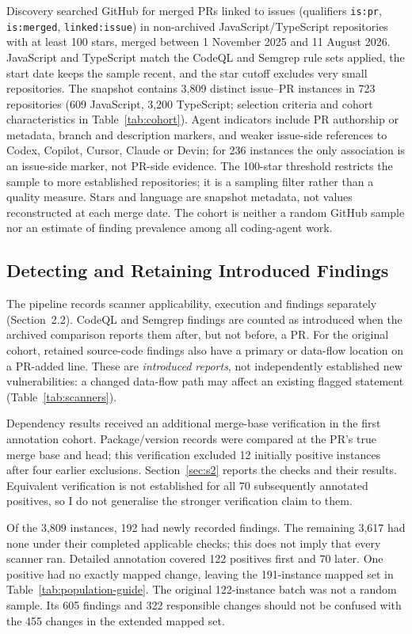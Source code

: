 \documentclass[acmsmall,screen,nonacm]{acmart}
\begin{document}
Discovery searched GitHub for merged PRs linked to issues (qualifiers \texttt{is:pr}, \texttt{is:merged}, \texttt{linked:issue}) in non-archived JavaScript/\allowbreak TypeScript repositories with at least 100 stars, merged between 1 November 2025 and 11 August 2026. JavaScript and TypeScript match the CodeQL and Semgrep rule sets applied, the start date keeps the sample recent, and the star cutoff excludes very small repositories. The snapshot contains 3,809 distinct issue--PR instances in 723 repositories (609 JavaScript, 3,200 TypeScript; selection criteria and cohort characteristics in Table~\ref{tab:cohort}). Agent indicators include PR authorship or metadata, branch and description markers, and weaker issue-side references to Codex, Copilot, Cursor, Claude or Devin; for 236 instances the only association is an issue-side marker, not PR-side evidence. The 100-star threshold restricts the sample to more established repositories; it is a sampling filter rather than a quality measure. Stars and language are snapshot metadata, not values reconstructed at each merge date. The cohort is neither a random GitHub sample nor an estimate of finding prevalence among all coding-agent work.

\subsection{Detecting and Retaining Introduced Findings}

The pipeline records scanner applicability, execution and findings separately (Section~2.2). CodeQL and Semgrep findings are counted as introduced when the archived comparison reports them after, but not before, a PR. For the original cohort, retained source-code findings also have a primary or data-flow location on a PR-added line. These are \emph{introduced reports}, not independently established new vulnerabilities: a changed data-flow path may affect an existing flagged statement (Table~\ref{tab:scanners}).

Dependency results received an additional merge-base verification in the first annotation cohort. Package/version records were compared at the PR's true merge base and head; this verification excluded 12 initially positive instances after four earlier exclusions. Section~\ref{sec:s2} reports the checks and their results. Equivalent verification is not established for all 70 subsequently annotated positives, so I do not generalise the stronger verification claim to them.

Of the 3,809 instances, 192 had newly recorded findings. The remaining 3,617 had none under their completed applicable checks; this does not imply that every scanner ran. Detailed annotation covered 122 positives first and 70 later. One positive had no exactly mapped change, leaving the 191-instance mapped set in Table~\ref{tab:population-guide}. The original 122-instance batch was not a random sample. Its 605 findings and 322 responsible changes should not be confused with the 455 changes in the extended mapped set.
\end{document}
